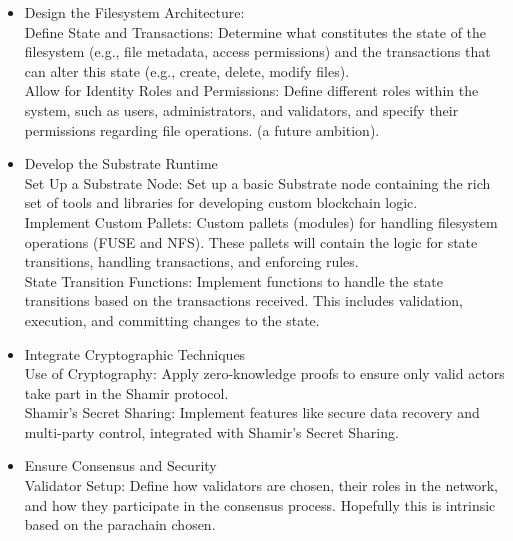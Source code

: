 \documentclass{tufte-handout}
\begin{document}
\begin{itemize}
\item Design the Filesystem Architecture:\\
\vspace{5pt}
Define State and Transactions: Determine what constitutes the state of the filesystem (e.g., file metadata, access permissions) and the
transactions that can alter this state (e.g., create, delete, modify files).\\
\vspace{5pt}
Allow for Identity Roles and Permissions: Define different roles within the system, such as users, administrators, and validators, and specify their
permissions regarding file operations. (a future ambition).
\item Develop the Substrate Runtime\\
\vspace{5pt}
Set Up a Substrate Node: Set up a basic Substrate node containing the rich set of tools and libraries for developing custom blockchain logic.\\
\vspace{5pt}
Implement Custom Pallets: Custom pallets (modules) for handling filesystem operations (FUSE and NFS). These pallets will contain the logic for state transitions,
handling transactions, and enforcing rules.\\
\vspace{5pt}
State Transition Functions: Implement functions to handle the state transitions based on the transactions received. This includes validation,
execution, and committing changes to the state.
\item Integrate Cryptographic Techniques\\
\vspace{5pt}
Use of Cryptography: Apply zero-knowledge proofs to ensure only valid actors take part in the Shamir protocol.\\
\vspace{5pt}
Shamir's Secret Sharing: Implement features like secure data recovery and multi-party control, integrated with  Shamir's Secret Sharing.
\item Ensure Consensus and Security\\
\vspace{5pt}
Validator Setup: Define how validators are chosen, their roles in the network, and how they participate in the consensus process. Hopefully this is
intrinsic based on the parachain chosen.\\
\vspace{5pt}

\end{itemize}
\end{document}
